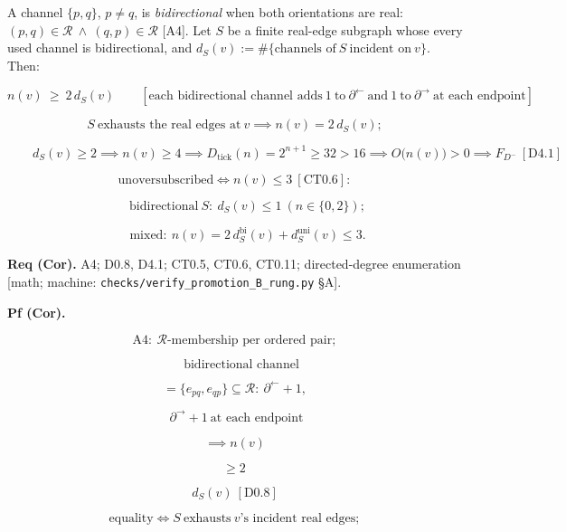 \begin{corollary}\label{tag:CT0-11b}
A channel $\{p,q\}$, $p\ne q$, is \textit{bidirectional} when both orientations are real: $(p,q)\in\mathcal R\ \wedge\ (q,p)\in\mathcal R$ [A4]. Let $S$ be a finite real-edge subgraph whose every used channel is bidirectional, and $d_S(v):=\#\{\text{channels of}\ S\ \text{incident on}\ v\}$. Then:

\[
n(v)\ \ge\ 2\,d_S(v)\qquad[\text{each bidirectional channel adds}\ 1\ \text{to}\ \partial^{\leftarrow}\ \text{and}\ 1\ \text{to}\ \partial^{\rightarrow}\ \text{at each endpoint}]
\]

\[
S\ \text{exhausts the real edges at}\ v\implies n(v)=2\,d_S(v);
\]

\[
\qquad d_S(v)\ge2\implies n(v)\ge4\implies D_{\mathrm{tick}}(n)=2^{n+1}\ge32>16\implies O\bigl(n(v)\bigr)>0\implies F_{D^-}\ [\mathrm{D4.1}]
\]

\[
\text{unoversubscribed}\iff n(v)\le3\ [\mathrm{CT0.6}]:
\]

\[
\qquad \text{bidirectional}\ S:\ d_S(v)\le1\ (n\in\{0,2\});
\]

\[
\qquad \text{mixed}:\ n(v)=2\,d^{\mathrm{bi}}_S(v)+d^{\mathrm{uni}}_S(v)\le3 .
\]

\textbf{Req (Cor).} A4; D0.8, D4.1; CT0.5, CT0.6, CT0.11; directed-degree enumeration [math; machine: \texttt{checks/\allowbreak{}verify\_\allowbreak{}promotion\_\allowbreak{}B\_\allowbreak{}rung.py} §A].

\textbf{Pf (Cor).}

\[
\mathrm{A4}:\ \mathcal R\text{-membership per ordered pair};
\]

\[
\quad\text{bidirectional channel}
\]

\[
= \{e_{pq},e_{qp}\}\subseteq\mathcal R:\ \partial^{\leftarrow}\!+1,
\]

\[
\ \partial^{\rightarrow}\!+1\ \text{at each endpoint}
\]

\[
\implies n(v)
\]

\[
\ge 2\,
\]

\[
d_S(v)\ [\mathrm{D0.8}]
\]

\[
\text{equality}\iff S\ \text{exhausts}\ v\text{'s incident real edges};
\]


\end{corollary}
